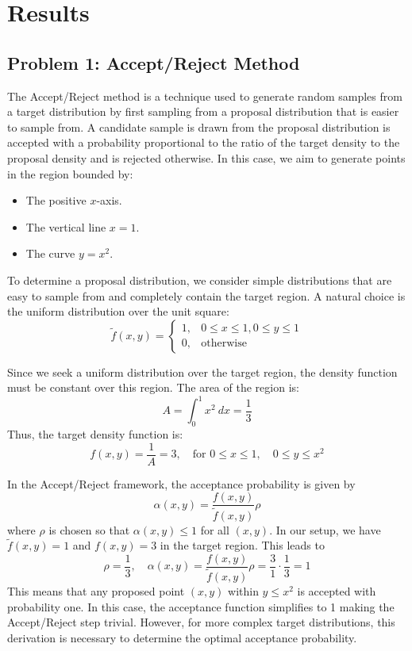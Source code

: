 \documentclass{report}
\begin{document}
\pagebreak

\section*{Results}
\subsection*{Problem 1: Accept/Reject Method} 

The Accept/Reject method is a technique used to generate random samples from a target distribution by first sampling from a proposal distribution that is easier to sample from. A candidate sample is drawn from the proposal distribution is accepted with a probability proportional to the ratio of the target density to the proposal density and is rejected otherwise. In this case, we aim to generate points in the region bounded by:

\begin{itemize}
\item The positive $x$-axis.
\item The vertical line $x=1$.
\item The curve \( y = x^2 \).
\end{itemize}

To determine a proposal distribution, we consider simple distributions that are easy to sample from and completely contain the target region. A natural choice is the uniform distribution over the unit square:
\[
\tilde{f}(x,y) =
\begin{cases}
1, & 0 \leq x \leq 1, 0 \leq y \leq 1 \\
0, & \text{otherwise}
\end{cases}
\]

Since we seek a uniform distribution over the target region, the density function must be constant over this region. The area of the region is:
\[
A = \int_{0}^{1} x^2\ dx= \frac{1}{3}
\]
Thus, the target density function is:
\[
f(x,y)=\frac{1}{A} = 3,\quad \text{for } 0\leq x \leq 1, \quad 0 \leq y \leq x^2
\]

In the Accept/Reject framework, the acceptance probability is given by
\[
\alpha(x, y)= \frac{f(x,y)}{\tilde{f}(x,y)} \rho
\]
where $\rho$ is chosen so that $\alpha(x,y) \leq 1$ for all $(x, y)$. In our setup, we have $\tilde{f}(x, y)=1$ and $f(x,y)=3$ in the target region. This leads to
\[
\rho = \frac{1}{3}, \quad \alpha(x, y)= \frac{f(x,y)}{\tilde{f}(x,y)} \rho = \frac{3}{1}\cdot \frac{1}{3} = 1
\]
This means that any proposed point $(x, y)$ within $y \leq x^2$ is accepted with probability one. In this case, the acceptance function simplifies to 1 making the Accept/Reject step trivial. However, for more complex target distributions, this derivation is necessary to determine the optimal acceptance probability.
\end{document}

